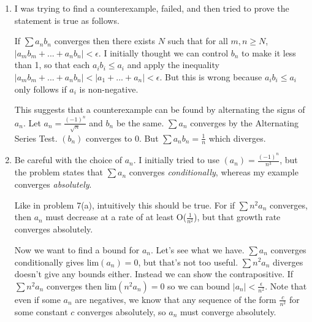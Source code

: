 \documentclass{oxmathproblems}
\begin{document}
\begin{questions}
\begin{solution}
\begin{enumerate}[label=(\alph*)]
    Here's a smarter proof from the internet. Since $\sum |a_{n}|$ converges absolutely then the sequence $|a_{n}|$ must converge to 0, so there exists $N$ such that for all $n \geq N$,
    $|a_{n}| < 1$. For those $n$, $|a_{n}^2| < |a_{n}|$, so we can apply the Comparison Test to conclude that $|a_{n}^2|$ converges absolutely.
  
    \item I was trying to find a counterexample, failed, and then tried to prove the statement is true as follows.
    
    If $\sum a_{n}b_{n}$ converges then there exists $N$ such that for all $m, n \geq N$, $|a_{m}b_{m} + ... + a_{n}b_{n}| < \epsilon$. I initially thought we can control $b_{n}$ to make
    it less than 1, so that each $a_{i}b_{i} \leq a_{i}$ and apply the inequality $|a_{m}b_{m} + ... + a_{n}b_{n}| < |a_{1} + ... + a_{n}| < \epsilon$. But this is wrong because
    $a_{i}b_{i} \leq a_{i}$ only follows if $a_{i}$ is non-negative.

    This suggests that a counterexample can be found by alternating the signs of $a_{n}$. Let $a_{n} = \frac{(-1)^{n}}{\sqrt{n}}$ and $b_{n}$ be the same. $\sum a_{n}$ converges
    by the Alternating Series Test. $(b_{n})$ converges to 0. But $\sum a_{n}b_{n} = \frac{1}{n}$ which diverges.

    \item Be careful with the choice of $a_{n}$. I initially tried to use $(a_{n}) = \frac{(-1)^{n}}{n^{3}}$, but the problem states that $\sum a_{n}$ converges \textit{conditionally},
    whereas my example converges \textit{absolutely}.

    Like in problem 7(a), intuitively this should be true. For if $\sum n^{2}a_{n}$ converges, then $a_{n}$ must decrease at a rate of at least O($\frac{1}{n^{2}}$), but that growth rate converges
    absolutely.

    Now we want to find a bound for $a_{n}$. Let's see what we have. $\sum a_{n}$ converges conditionally gives lim$(a_{n}) = 0$, but that's not too useful. $\sum n^{2}a_{n}$ diverges doesn't
    give any bounds either. Instead we can show the contrapositive. If $\sum n^{2}a_{n}$ converges then lim$(n^{2}a_{n}) = 0$ so we can bound $|a_{n}| < \frac{\epsilon}{n^{2}}$. Note that even
    if some $a_{n}$ are negatives, we know that any sequence of the form $\frac{c}{n^{2}}$ for some constant $c$ converges absolutely, so $a_{n}$ must converge absolutely.
  \end{enumerate}


\end{solution}
\end{questions}
\end{document}
